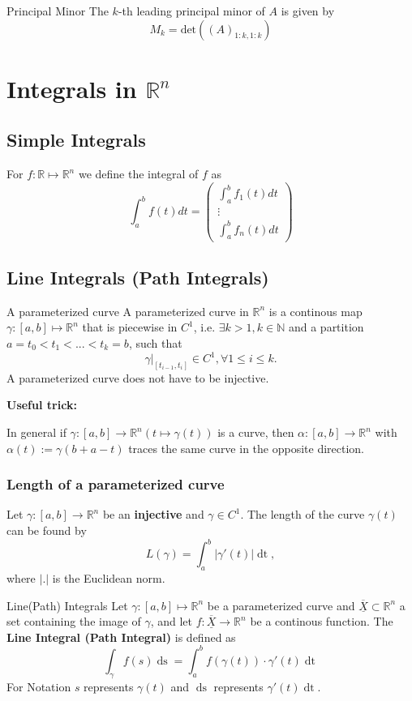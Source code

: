 \documentclass[a4paper,fontsize = 10pt]{article}
\def\R{\mathbb{R}}
\def\N{\mathbb{N}}
\def\X{\underline{\overline{X}}}
\begin{document}
\begin{subbox}{Principal Minor}
    The $k$-th leading principal minor of $A$ is given by 
    \[M_k = \text{det}\left((A)_{1:k,1:k}\right)\]
\end{subbox}


\section{Integrals in \texorpdfstring{\(\R^n\)}{Rⁿ}}
\subsection{Simple Integrals}
For \(f: \R \mapsto \R^n\) we define the integral of $f$ as
\[\int_a^b f(t)dt = 
\begin{pmatrix*}
  \int_a^b f_1(t) dt \\
  \vdots\\
  \int_a^b f_n(t) dt
\end{pmatrix*}
\]

\subsection{Line Integrals (Path Integrals)}
\begin{mainbox}{A parameterized curve}
    A parameterized curve in \(\R^n\) is a continous map \(\gamma: \left[a,b\right] \mapsto \R^n\) that is piecewise in \(C^1\), 
    i.e. \(\exists k > 1, k \in \N\) and a partition \(a = t_0 < t_1 < ... < t_k = b\), such that 
    \[\gamma|_{[t_{i-1}, t_i]} \in C^1, \forall 1 \leq i \leq k.\] 
    A parameterized curve does not have to be injective.
  \end{mainbox}
  \textbf{Useful trick:}

  In general if $\gamma: [a, b] \to \R^n (t \mapsto \gamma(t))$ is a curve, then $\alpha: [a,b] \to \R^n$ with $\alpha(t) := \gamma(b+a - t)$ traces the same curve in the opposite direction. 
  
  \subsubsection*{Length of a parameterized curve}
  Let $\gamma: [a, b] \to \R^n$ be an \textbf{injective} and $\gamma \in C^1$. The length of the curve $\gamma(t)$ can be found by 
  \[L(\gamma) = \int_a^b |\gamma'(t)|\mathop{dt},\] where $|.|$ is the Euclidean norm.

\begin{mainbox}{Line(Path) Integrals}
    Let \(\gamma : \left[a,b\right] \mapsto \R^n\) be a parameterized curve and \(\X \subset \R^n\) a set containing the image of $\gamma$, and let $f: \X \to \R^n$ be a continous function. The \textbf{Line Integral (Path Integral)} is defined as 
    \[\int_\gamma f(s) \mathop{ds} = \int_a^b f(\gamma(t)) \cdot \gamma'(t) \mathop{dt}\]
    For Notation $s$ represents $\gamma(t)$ and $\mathop{ds}$ represents $\gamma'(t)\mathop{dt}$.
\end{mainbox}
\end{document}
